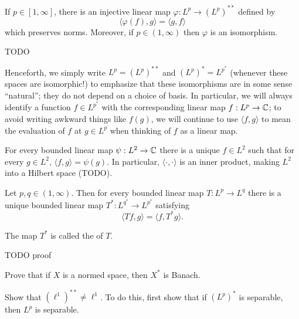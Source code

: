 \begin{corollary}
If $p \in [1, \infty]$, there is an injective linear map $\varphi: L^{p} \to (L^p)^{**}$ defined by
\[\langle \varphi(f), g\rangle = \langle g, f\rangle\]
which preserves norms. Moreover, if $p \in (1, \infty)$ then $\varphi$ is an isomorphism.
\end{corollary}
TODO

Henceforth, we simply write $L^{p} = (L^p)^{**}$ and $(L^p)^* = L^{p^*}$ (whenever these spaces are isomorphic!) to emphasize that these isomorphisms are in some sense ``natural''; they do not depend on a choice of basis.
In particular, we will always identify a function $f \in L^{p^*}$ with the corresponding linear map $f: L^{p} \to \mathbb{C}$; to avoid writing awkward things like $f(g)$, we will continue to use $\langle f, g\rangle$ to mean the evaluation of $f$ at $g \in L^p$ when thinking of $f$ as a linear map.

\begin{corollary}
For every bounded linear map $\psi: L^2 \to \mathbb{C}$ there is a unique $f \in L^2$ such that for every $g \in L^2$, $\langle f, g\rangle = \psi(g)$.
In particular, $\langle \cdot, \cdot \rangle$ is an inner product, making $L^2$ into a Hilbert space (TODO).
\end{corollary}

\begin{theorem}
Let $p, q \in (1, \infty)$. Then for every bounded linear map $T: L^{p} \to L^q$ there is a unique bounded linear map $T^*: L^{q^*} \to L^{p^*}$ satisfying
\[\langle Tf, g\rangle = \langle f, T^*g\rangle.\]
\end{theorem}
\begin{definition}
The map $T^*$ is called the  of $T$.
\end{definition}
TODO proof





\begin{exercise}
\label{dual space is banach}
Prove that if $X$ is a normed space, then $X^*$ is Banach.
\end{exercise}

\begin{exercise}
Show that $(\ell^1)^{**} \neq \ell^1$.
To do this, first show that if $(L^p)^*$ is separable, then $L^p$ is separable.
\end{exercise}

